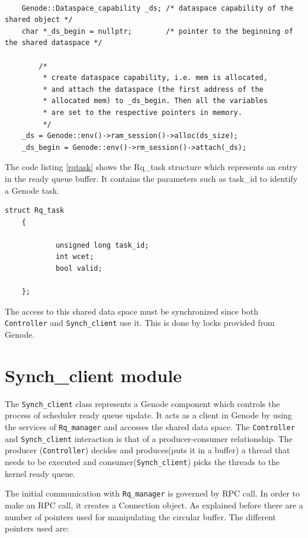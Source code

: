 \begin{lstlisting}[caption={Allocating data space},label={rqbuffer}, style=customcpp]

	Genode::Dataspace_capability _ds; /* dataspace capability of the shared object */
	char *_ds_begin = nullptr;        /* pointer to the beginning of the shared dataspace */

		/* 
		 * create dataspace capability, i.e. mem is allocated,
		 * and attach the dataspace (the first address of the
		 * allocated mem) to _ds_begin. Then all the variables
		 * are set to the respective pointers in memory.
		 */
	_ds = Genode::env()->ram_session()->alloc(ds_size);
	_ds_begin = Genode::env()->rm_session()->attach(_ds);

\end{lstlisting}

The code listing \ref{rqtask} shows the Rq\_task structure which represents an entry in the ready queue buffer. It contains the parameters such as task\_id to identify a Genode task.

\begin{lstlisting}[caption={Rq\_task structure},label={rqtask}, style=customcpp]
 struct Rq_task
 	{
 
			unsigned long task_id;
 			int wcet;
 			bool valid;
 
 	};
\end{lstlisting}

The access to this shared data space must be synchronized since both \texttt{Controller} and \texttt{Synch\_client} use  it. This is done by locks provided from Genode.

\section{Synch\_client module}
The \texttt{Synch\_client} class represents a Genode component which controls the process of scheduler ready queue update. It acts as a client in Genode by using the services of \texttt{Rq\_manager} and accesses the shared data space. The \texttt{Controller} and \texttt{Synch\_client} interaction is that of a producer-consumer relationship. The producer (\texttt{Controller}) decides and produces(puts it in a buffer) a thread that needs to be executed and consumer(\texttt{Synch\_client}) picks the threads to the kernel ready queue.

The initial communication with \texttt{Rq\_manager} is governed by RPC call. In order to make an RPC call, it creates a Connection object. As explained before there are a number of pointers used for manipulating the circular buffer. The different pointers used are:

